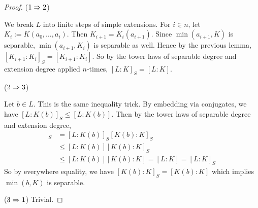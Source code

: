 \documentclass[../book.tex]{subfiles}
\begin{document}
\begin{proof}
    ($1\Rightarrow 2$)
        
        We break $L$ into finite steps of simple extensions. 
        For $i\in n$, let $K_i := K(a_0,\dots,a_i)$.
        Then $K_{i+1} = K_i(a_{i+1})$. 
        Since $\min(a_{i+1},K)$ is separable, $\min(a_{i+1},K_i)$ is separable as well. 
        Hence by the previous lemma, $[K_{i+1}:K_i]_S = [K_{i+1}:K_i]$. 
        So by the tower laws of separable degree and extension degree applied $n$-times, 
        $[L : K]_S = [L : K]$. 
        
    ($2\Rightarrow 3$)
        
        Let $b \in L$. 
        This is the same inequality trick.
        By embedding via conjugates, we have $[L : K(b)]_S \leq [L : K(b)]$. 
        Then by the tower laws of separable degree and extension degree,
        \begin{align*}
            [L : K]_S &= [L : K(b)]_S [K(b) : K]_S \\
            &\leq [L : K(b)] [K(b) : K]_S \\
            &\leq [L : K(b)] [K(b) : K] = [L : K] = [L : K]_S 
        \end{align*}
        So by everywhere equality, we have $[K(b) : K]_S = [K(b) : K]$
        which implies $\min(b,K)$ is separable. 
        
    ($3\Rightarrow 1$)
        Trivial. 
\end{proof}

    
\end{document}
